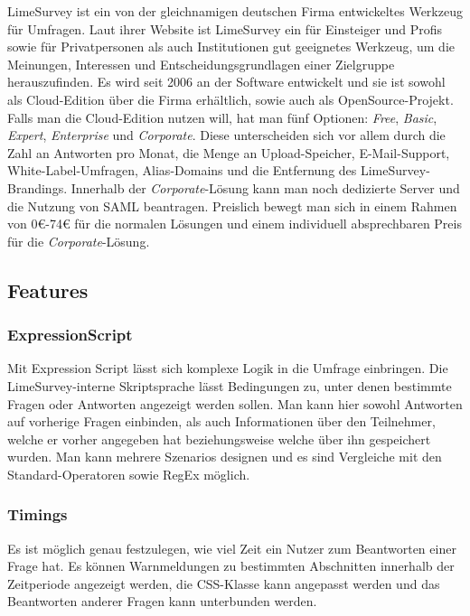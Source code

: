 LimeSurvey ist ein von der gleichnamigen deutschen Firma entwickeltes Werkzeug für Umfragen.
Laut ihrer Website ist LimeSurvey ein für Einsteiger und Profis sowie für Privatpersonen als auch Institutionen gut geeignetes Werkzeug, um die Meinungen, Interessen und Entscheidungsgrundlagen einer Zielgruppe herauszufinden.
Es wird seit 2006 an der Software entwickelt und sie ist sowohl als Cloud-Edition über die Firma erhältlich, sowie auch als OpenSource-Projekt.\\

Falls man die Cloud-Edition nutzen will, hat man fünf Optionen: \textit{Free}, \textit{Basic}, \textit{Expert}, \textit{Enterprise} und \textit{Corporate}.
Diese unterscheiden sich vor allem durch die Zahl an Antworten pro Monat, die Menge an Upload-Speicher, E-Mail-Support, White-Label-Umfragen, Alias-Domains und die Entfernung des LimeSurvey-Brandings.
Innerhalb der \textit{Corporate}-Lösung kann man noch dedizierte Server und die Nutzung von SAML beantragen.
Preislich bewegt man sich in einem Rahmen von 0€-74€ für die normalen Lösungen und einem individuell absprechbaren Preis für die \textit{Corporate}-Lösung.

\subsection{Features}
\subsubsection{ExpressionScript}
\label{m:expr_script}
Mit Expression Script lässt sich komplexe Logik in die Umfrage einbringen.
Die LimeSurvey-interne Skriptsprache lässt Bedingungen zu, unter denen bestimmte Fragen oder Antworten angezeigt werden sollen.
Man kann hier sowohl Antworten auf vorherige Fragen einbinden, als auch Informationen über den Teilnehmer, welche er vorher angegeben hat beziehungsweise welche über ihn gespeichert wurden.
Man kann mehrere Szenarios designen und es sind Vergleiche mit den Standard-Operatoren sowie RegEx möglich.

\subsubsection{Timings}

Es ist möglich genau festzulegen, wie viel Zeit ein Nutzer zum Beantworten einer Frage hat.
Es können Warnmeldungen zu bestimmten Abschnitten innerhalb der Zeitperiode angezeigt werden, die CSS-Klasse kann angepasst werden und das Beantworten anderer Fragen kann unterbunden werden.


